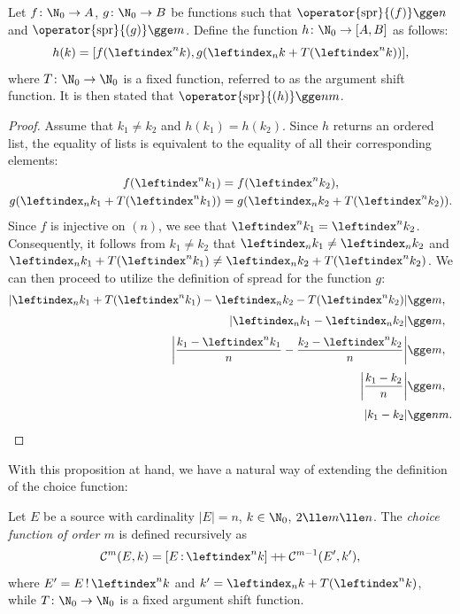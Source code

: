 \documentclass[12pt, a4paper]{article}
\renewcommand{\C}{\mathcal{C}}
\newcommand{\dop}{\mathbin{{+}\hspace{-1mm}{+}}}
\newcommand{\spr}[1]{\operator{\mathrm{spr}}{(#1)}}
\newcommand{\lli}[1]{\leftindex_{#1}}
\newcommand{\lui}[1]{\leftindex^{#1}}
\newcommand{\elt}{\mathop{:}}
\newcommand{\wo}{\mathop{!}}
\begin{document}
\begin{proposition}\label{map}
    Let $ f \colon \N_0 \to A $, $ g \colon \N_0 \to B $ be functions such that $ \spr{f} \gge n $ and $ \spr{g} \gge m $. Define the function $ h \colon \N_0 \to [A, B] $ as follows:
    \[ h(k) = [f(\lui{n}k), g(\lli{n}k + T(\lui{n}k))], \]
    where $ T \colon \N_0 \to \N_0 $ is a fixed function, referred to as the argument shift function. It is then stated that $ \spr{h} \gge nm $.
\end{proposition}
\begin{proof}
    Assume that $ k_1 \ne k_2 $ and $ h(k_1) = h(k_2) $. Since $ h $ returns an ordered list, the equality of lists is equivalent to the equality of all their corresponding elements:
    \begin{gather}
        f(\lui{n}k_1) = f(\lui{n}k_2),\label{one}\\
        g(\lli{n}k_1 + T(\lui{n}k_1)) = g(\lli{n}k_2 + T(\lui{n}k_2)).\label{two}
    \end{gather}
    Since $ f $ is injective on $ (n) $, we see that $ \lui{n}k_1 = \lui{n}k_2 $. Consequently, it follows from $ k_1 \ne k_2 $ that $ \lli{n}k_1 \ne \lli{n}k_2 $ and $ \lli{n}k_1 + T(\lui{n}k_1) \ne \lli{n}k_2 + T(\lui{n}k_2) $. We can then proceed to utilize the definition of spread for the function $ g $:
    \begin{align*}
    | \lli{n}k_1 + T(\lui{n}k_1) - \lli{n}k_2 - T(\lui{n}k_2) | &\gge m,\\[1mm]
    | \lli{n}k_1 - \lli{n}k_2 | &\gge m,\\[1mm]
    \left| \frac{k_1 - \lui{n}k_1}{n} - \frac{k_2 - \lui{n}k_2}{n} \right| &\gge m,\\[1mm]
    \left| \frac{k_1 - k_2}{n} \right| &\gge m,\\[1mm]
    | k_1 - k_2 | &\gge nm.
    \end{align*}
\end{proof}

With this proposition at hand, we have a natural way of extending the definition of the choice function:

\begin{definition}
    Let $ E $ be a source with cardinality $ |E| = n $, $ k \in \N_0 $, $ 2 \lle m \lle n $. The \emph{choice function of order $ m $} is defined recursively as
    \[ \C^m(E, k) = [E \elt \lui{n}k] \dop \C^{m-1}(E', k'), \]
    where $ E' = E \wo \lui{n}k $ and $ k' = \lli{n}k + T(\lui{n}k) $, while $ T \colon \N_0 \to \N_0 $ is a fixed argument shift function.
\end{definition}
\end{document}
